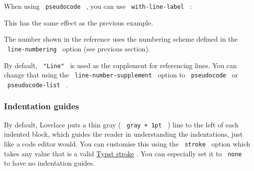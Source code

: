 \begin{Shaded}
\begin{Highlighting}[]
\NormalTok{\#pseudocode{-}list[}
\NormalTok{]}

\end{Highlighting}
\end{Shaded}

\pandocbounded{}

When using \texttt{\ pseudocode\ } , you can use
\texttt{\ with-line-label\ } :

\begin{Shaded}
\begin{Highlighting}[]
\NormalTok{)}

\end{Highlighting}
\end{Shaded}

This has the same effect as the previous example.

The number shown in the reference uses the numbering scheme defined in
the \texttt{\ line-numbering\ } option (see previous section).

By default, \texttt{\ "Line"\ } is used as the supplement for
referencing lines. You can change that using the
\texttt{\ line-number-supplement\ } option to \texttt{\ pseudocode\ } or
\texttt{\ pseudocode-list\ } .

\subsubsection{Indentation guides}\label{indentation-guides}

By default, Lovelace puts a thin gray ( \texttt{\ gray\ +\ 1pt\ } ) line
to the left of each indented block, which guides the reader in
understanding the indentations, just like a code editor would. You can
customise this using the \texttt{\ stroke\ } option which takes any
value that is a valid
\href{https://typst.app/docs/reference/visualize/stroke/}{Typst stroke}
. You can especially set it to \texttt{\ none\ } to have no indentation
guides.

